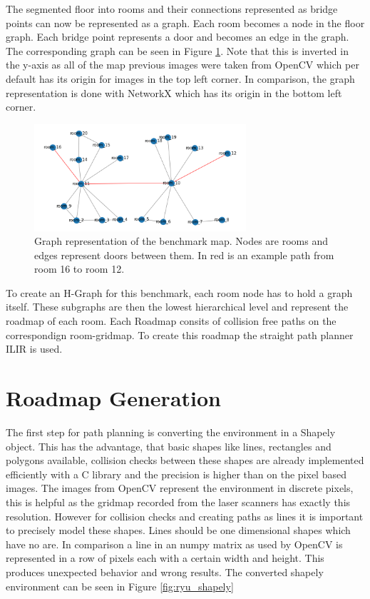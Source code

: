 The segmented floor into rooms and their connections represented as bridge points can now be represented as a graph. Each room becomes a node in the floor graph. Each bridge point represents a door and becomes an edge in the graph. The corresponding graph can be seen in Figure \ref{fig:ryu_graph}. Note that this is inverted in the y-axis as all of the map previous images were taken from OpenCV which per default has its origin for images in the top left corner. In comparison, the graph representation is done with NetworkX which has its origin in the bottom left corner. 

\begin{figure}[h]
    \centering
    \includegraphics[width=0.7\textwidth]{figures/50_implementation/ryu_floor_graph.png}
    \caption[Graph representation of the benchmark map]{Graph representation of the benchmark map. Nodes are rooms and edges represent doors between them. In red is an example path from room 16 to room 12.}
    \label{fig:ryu_graph}
\end{figure}

To create an H-Graph for this benchmark, each room node has to hold a graph itself. These subgraphs are then the lowest hierarchical level and represent the roadmap of each room. Each Roadmap consits of collision free paths on the correspondign room-gridmap. To create this roadmap the straight path planner ILIR is used.


\section{Roadmap Generation}
\label{sec:roadmap_generation}
The first step for path planning is converting the environment in a Shapely object. This has the advantage, that basic shapes like lines, rectangles and polygons available, collision checks between these shapes are already implemented efficiently with a C library and the precision is higher than on the pixel based images. The images from OpenCV represent the environment in discrete pixels, this is helpful as the gridmap recorded from the laser scanners has exactly this resolution. However for collision checks and creating paths as lines it is important to precisely model these shapes. Lines should be one dimensional shapes which have no are. In comparison a line in an numpy matrix as used by OpenCV is represented in a row of pixels each with a certain width and height. This produces unexpected behavior and wrong results. The converted shapely environment can be seen in Figure \ref{fig:ryu_shapely}

